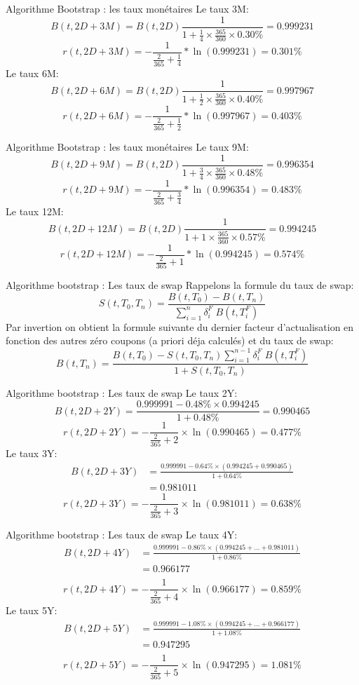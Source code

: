 \documentclass{beamer}
\begin{document}
\begin{frame}{Algorithme Bootstrap : les taux monétaires}
Le taux 3M:
\[
B(t,2D+3M)=B(t,2D)\frac{1}{1+\frac{1}{4} \times \frac{365}{360}  \times 0.30\%}=0.999231
\]
\[r(t,2D+3M)=-\frac{1}{\frac{2}{365}+\frac{1}{4}}*\ln(0.999231)=0.301\%
\]
Le taux 6M:
\[
B(t,2D+6M)=B(t,2D)\frac{1}{1+\frac{1}{2} \times \frac{365}{360}  \times 0.40\%}=0.997967
\]
\[r(t,2D+6M)=-\frac{1}{\frac{2}{365}+\frac{1}{2}}*\ln(0.997967)=0.403\%
\]
\end{frame}

\begin{frame}{Algorithme Bootstrap : les taux monétaires}
Le taux 9M:
\[
B(t,2D+9M)=B(t,2D)\frac{1}{1+\frac{3}{4} \times \frac{365}{360}  \times 0.48\%}=0.996354
\]
\[r(t,2D+9M)=-\frac{1}{\frac{2}{365}+\frac{3}{4}}*\ln(0.996354)=0.483\%
\]
Le taux 12M:
\[
B(t,2D+12M)=B(t,2D)\frac{1}{1+1 \times \frac{365}{360}  \times 0.57\%}=0.994245
\]
\[r(t,2D+12M)=-\frac{1}{\frac{2}{365}+1}*\ln(0.994245)=0.574\%
\]
\end{frame}

\begin{frame}{Algorithme bootstrap : Les taux de swap}
Rappelons la formule du taux de swap:
\[
S(t,T_0,T_n)=\frac{B(t,T_0)-B(t,T_n)}{ \sum_{i=1}^{n}\delta_i^F \;B(t,T_i^F)}
\]
Par invertion on obtient la formule suivante du dernier facteur d'actualisation en fonction des autres zéro coupons (a priori déja calculés) et du taux de swap:
\[
B(t,T_n)=\frac{B(t,T_0)-S(t,T_0,T_n)\sum_{i=1}^{n-1}\delta_i^F \;B(t,T_i^F)}{1+S(t,T_0,T_n)}
\]
\end{frame}

\begin{frame}{Algorithme bootstrap : Les taux de swap}
Le taux 2Y:
\[
B(t,2D+2Y)=\frac{0.999991-0.48\% \times 0.994245}{1+0.48\%}=0.990465
\]
\[
r(t,2D+2Y)=-\frac{1}{\frac{2}{365}+2} \times \ln(0.990465)=0.477\%
\]
Le taux 3Y:
\[
\begin{split}
B(t,2D+3Y)&=\frac{0.999991-0.64\% \times (0.994245 + 0.990465)}{1+0.64\%}\\
&=0.981011
\end{split}
\]
\[
r(t,2D+3Y)=-\frac{1}{\frac{2}{365}+3} \times \ln(0.981011)=0.638\%
\]
\end{frame}

\begin{frame}{Algorithme bootstrap : Les taux de swap}
Le taux 4Y:
\[
\begin{split}
B(t,2D+4Y)&=\frac{0.999991-0.86\%  \times (0.994245 + ... + 0.981011)}{1+0.86\%}\\
&=0.966177\\
\end{split}
\]
\[
r(t,2D+4Y)=-\frac{1}{\frac{2}{365}+4} \times \ln(0.966177)=0.859\%
\]
Le taux 5Y:
\[
\begin{split}
B(t,2D+5Y)&=\frac{0.999991-1.08\% \times \left(0.994245 + ... + 0.966177\right)}{1+1.08\%}\\
&=0.947295\\
\end{split}
\]
\[
r(t,2D+5Y)=-\frac{1}{\frac{2}{365}+5} \times \ln(0.947295)=1.081\%
\]
\end{frame}
\end{document}
